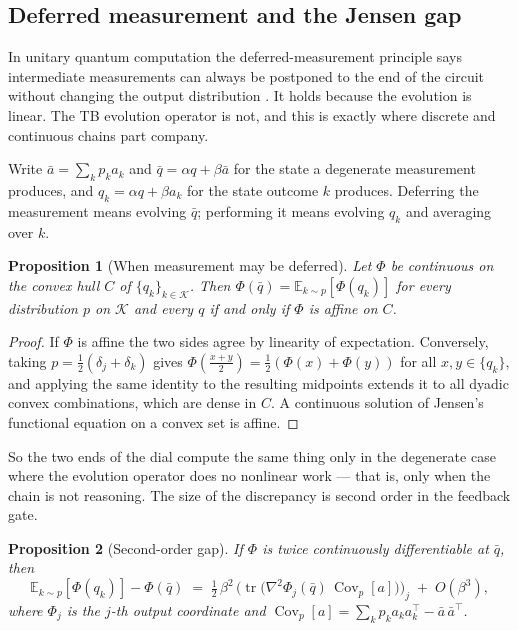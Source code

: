 \documentclass[11pt]{article}
\newtheorem{proposition}{Proposition}
\theoremstyle{definition}
\newcommand{\Ev}{\Phi}
\newcommand{\Exp}{\mathbb{E}}
\newcommand{\Cov}{\operatorname{Cov}}
\newcommand{\tr}{\operatorname{tr}}
\begin{document}
\subsection{Deferred measurement and the Jensen gap}
\label{sec:jensen}

In unitary quantum computation the deferred-measurement principle says intermediate
measurements can always be postponed to the end of the circuit without changing the
output distribution \citep{nielsen2010quantum}. It holds because the evolution is
linear. The TB evolution operator is not, and this is exactly where discrete and
continuous chains part company.

Write $\bar a = \sum_k p_k a_k$ and $\bar q = \alpha q + \beta \bar a$ for the state
a degenerate measurement produces, and $q_k = \alpha q + \beta a_k$ for the state
outcome $k$ produces. Deferring the measurement means evolving $\bar q$; performing
it means evolving $q_k$ and averaging over $k$.

\begin{proposition}[When measurement may be deferred]
\label{prop:defer}
Let $\Ev$ be continuous on the convex hull $C$ of $\{q_k\}_{k\in\mathcal{K}}$. Then
$\Ev(\bar q) = \Exp_{k\sim p}[\Ev(q_k)]$ for every distribution $p$ on
$\mathcal{K}$ and every $q$ if and only if $\Ev$ is affine on $C$.
\end{proposition}

\begin{proof}
If $\Ev$ is affine the two sides agree by linearity of expectation. Conversely,
taking $p = \tfrac12(\delta_j + \delta_k)$ gives
$\Ev\!\left(\tfrac{x+y}{2}\right) = \tfrac12(\Ev(x) + \Ev(y))$ for all
$x, y \in \{q_k\}$, and applying the same identity to the resulting midpoints
extends it to all dyadic convex combinations, which are dense in $C$. A continuous
solution of Jensen's functional equation on a convex set is affine.
\end{proof}

So the two ends of the dial compute the same thing only in the degenerate case where
the evolution operator does no nonlinear work --- that is, only when the chain is not
reasoning. The size of the discrepancy is second order in the feedback gate.

\begin{proposition}[Second-order gap]
\label{prop:second-order}
If $\Ev$ is twice continuously differentiable at $\bar q$, then
\begin{equation}
\Exp_{k \sim p}\!\left[\Ev(q_k)\right] - \Ev(\bar q)
\;=\;
\tfrac{1}{2}\,\beta^{2}\,
\Big(\tr\!\big(\nabla^{2}\Ev_{j}(\bar q)\,\Cov_p[a]\big)\Big)_{j}
\;+\; O(\beta^{3}),
\label{eq:gap}
\end{equation}
where $\Ev_j$ is the $j$-th output coordinate and
$\Cov_p[a] = \sum_k p_k a_k a_k^{\top} - \bar a\,\bar a^{\top}$.
\end{proposition}
\end{document}
